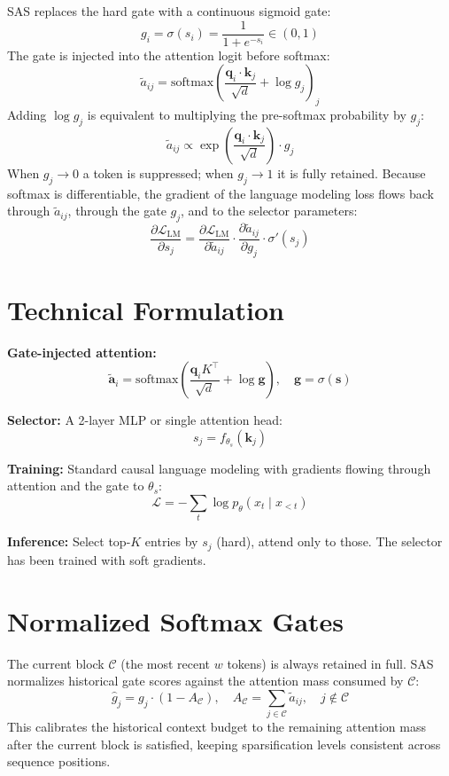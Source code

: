 \documentclass[10pt,twocolumn]{article}
\begin{document}
SAS replaces the hard gate with a continuous sigmoid gate:
\[
  g_i = \sigma(s_i) = \frac{1}{1 + e^{-s_i}} \in (0,1)
\]
The gate is injected into the attention logit before softmax:
\[
  \tilde{a}_{ij} = \mathrm{softmax}\!\left(
    \frac{\mathbf{q}_i\cdot\mathbf{k}_j}{\sqrt{d}} + \log g_j
  \right)_j
\]
Adding $\log g_j$ is equivalent to multiplying the pre-softmax
probability by $g_j$:
\[
  \tilde{a}_{ij} \propto \exp\!\left(\frac{\mathbf{q}_i\cdot\mathbf{k}_j}
  {\sqrt{d}}\right)\cdot g_j
\]
When $g_j\to 0$ a token is suppressed; when $g_j\to 1$ it is fully
retained. Because softmax is differentiable, the gradient of the
language modeling loss flows back through $\tilde{a}_{ij}$, through
the gate $g_j$, and to the selector parameters:
\[
  \frac{\partial\mathcal{L}_{\mathrm{LM}}}{\partial s_j}
  = \frac{\partial\mathcal{L}_{\mathrm{LM}}}{\partial\tilde{a}_{ij}}
    \cdot\frac{\partial\tilde{a}_{ij}}{\partial g_j}
    \cdot\sigma'(s_j)
\]

\section{Technical Formulation}

\textbf{Gate-injected attention:}
\[
  \tilde{\mathbf{a}}_i = \mathrm{softmax}\!\left(
    \frac{\mathbf{q}_i K^\top}{\sqrt{d}} + \log\mathbf{g}
  \right),\quad \mathbf{g} = \sigma(\mathbf{s})
\]

\textbf{Selector:} A 2-layer MLP or single attention head:
\[
  s_j = f_{\theta_s}(\mathbf{k}_j)
\]

\textbf{Training:} Standard causal language modeling with gradients
flowing through attention and the gate to $\theta_s$:
\[
  \mathcal{L} = -\sum_t\log p_\theta(x_t\mid x_{<t})
\]

\textbf{Inference:} Select top-$K$ entries by $s_j$ (hard), attend
only to those. The selector has been trained with soft gradients.

\section{Normalized Softmax Gates}

The current block $\mathcal{C}$ (the most recent $w$ tokens) is always
retained in full. SAS normalizes historical gate scores against the
attention mass consumed by $\mathcal{C}$:
\[
  \hat{g}_j = g_j\cdot(1 - A_{\mathcal{C}}),
  \quad A_{\mathcal{C}} = \sum_{j\in\mathcal{C}}\tilde{a}_{ij},
  \quad j\notin\mathcal{C}
\]
This calibrates the historical context budget to the remaining
attention mass after the current block is satisfied, keeping
sparsification levels consistent across sequence positions.
\end{document}
